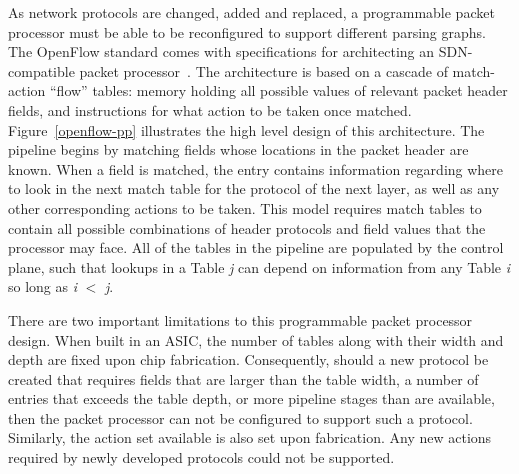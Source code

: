 As network protocols are changed, added and replaced, a programmable packet processor must be able to be reconfigured to support different parsing graphs.
The OpenFlow standard comes with specifications for architecting an SDN-compatible packet processor~\cite{opennet}.
The architecture is based on a cascade of match-action ``flow'' tables: memory holding all possible values of relevant packet header fields, and instructions for what action to be taken once matched.
Figure~\ref{openflow-pp} illustrates the high level design of this architecture.
The pipeline begins by matching fields whose locations in the packet header are known.
When a field is matched, the entry contains information regarding where to look in the next match table for the protocol of the next layer, as well as any other corresponding actions to be taken.
This model requires match tables to contain all possible combinations of header protocols and field values that the processor may face.
All of the tables in the pipeline are populated by the control plane, such that lookups in a Table \textit{j} can depend on information from any Table \textit{i} so long as \textit{i} $<$ \textit{j}.


There are two important limitations to this programmable packet processor design.
When built in an ASIC, the number of tables along with their width and depth are fixed upon chip fabrication.
Consequently, should a new protocol be created that requires fields that are larger than the table width, a number of entries that exceeds the table depth, or more pipeline stages than are available, then the packet processor can not be configured to support such a protocol.
Similarly, the action set available is also set upon fabrication.
Any new actions required by newly developed protocols could not be supported.


